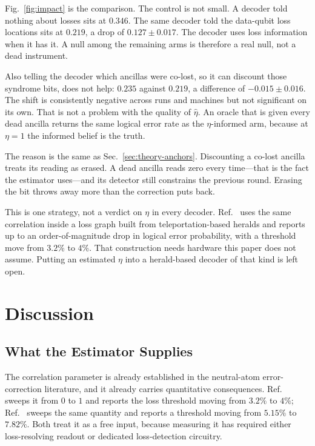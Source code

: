 \documentclass{ieeeaccess}
\begin{document}
Fig.~\ref{fig:impact} is the comparison. The control is not small. A decoder
told nothing about losses sits at $0.346$. The same decoder told the
data-qubit loss locations sits at $0.219$, a drop of $0.127\pm 0.017$. The
decoder uses loss information when it has it. A null among the remaining arms
is therefore a real null, not a dead instrument.

Also telling the decoder which ancillas were co-lost, so it can discount those
syndrome bits, does not help: $0.235$ against $0.219$, a difference of
$-0.015\pm 0.016$. The shift is consistently negative across runs and machines
but not significant on its own. That is not a problem with the quality of
$\hat\eta$. An oracle that is given every dead ancilla returns the same
logical error rate as the $\eta$-informed arm, because at $\eta=1$ the
informed belief is the truth.

The reason is the same as Sec.~\ref{sec:theory-anchors}. Discounting a
co-lost ancilla treats its reading as erased. A dead ancilla reads zero
every time---that is the fact the estimator uses---and its detector still
constrains the previous round. Erasing the bit throws away more than the
correction puts back.

This is one strategy, not a verdict on $\eta$ in every decoder.
Ref.~\cite{perrin2026correlatedloss} uses the same correlation inside a loss
graph built from teleportation-based heralds and reports up to an
order-of-magnitude drop in logical error probability, with a threshold move
from $3.2\%$ to $4\%$. That construction needs hardware this paper does not
assume. Putting an estimated $\eta$ into a herald-based decoder of that kind
is left open.


\section{Discussion}
\label{sec:discussion}

\subsection{What the Estimator Supplies}
\label{sec:disc-purpose}

The correlation parameter is already established in the neutral-atom
error-correction literature, and it already carries quantitative consequences.
Ref.~\cite{perrin2026correlatedloss} sweeps it from $0$ to $1$ and reports the
loss threshold moving from $3.2\%$ to $4\%$;
Ref.~\cite{liu2026optimaldistanceatomloss} sweeps the same quantity and reports
a threshold moving from $5.15\%$ to $7.82\%$. Both treat it as a free input,
because measuring it has required either loss-resolving readout or dedicated
loss-detection circuitry.
\end{document}
